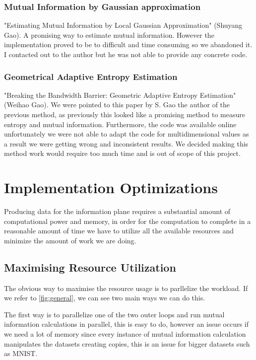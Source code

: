 \documentclass[dissertation.tex]{subfiles}
\begin{document}
\subsubsection{Mutual Information by Gaussian approximation}
  
  "Estimating Mutual Information by Local Gaussian Approximation" (Shuyang Gao). A
  promising way to estimate mutual information. However the implementation
  proved to be to difficult and time consuming so we abandoned it. I contacted
  out to the author but he was not able to provide any concrete code.

\subsubsection{Geometrical Adaptive Entropy Estimation}

  "Breaking the Bandwidth Barrier: Geometric Adaptive Entropy Estimation"
  (Weihao Gao). We were pointed to this paper by S. Gao the author of the
  previous method, as previously this looked like a promising method to measure
  entropy and mutual information. Furthermore, the code was available online
  unfortunately we were not able to adapt the code for multidimensional values
  as a result we were getting wrong and inconsistent results. We decided making
  this method work would require too much time and is out of scope of this
  project.

\section{Implementation Optimizations}

Producing data for the information plane requires a substantial amount of
computational power and memory, in order for the computation to complete in a
reasonable amount of time we have to utilize all the available resources and
minimize the amount of work we are doing.

\subsection{Maximising Resource Utilization}

The obvious way to maximise the resource usage is to parllelize the workload.
If we refer to \autoref{fig:general}, we can see two main ways we can do this.

The first way is to parallelize one of the two outer loops and run mutual
information calculations in parallel, this is easy to do, however an issue
occurs if we need a lot of memory since every instance of mutual information
calculation manipulates the datasets creating copies, this is an issue for
bigger datasets such as MNIST.
\end{document}
